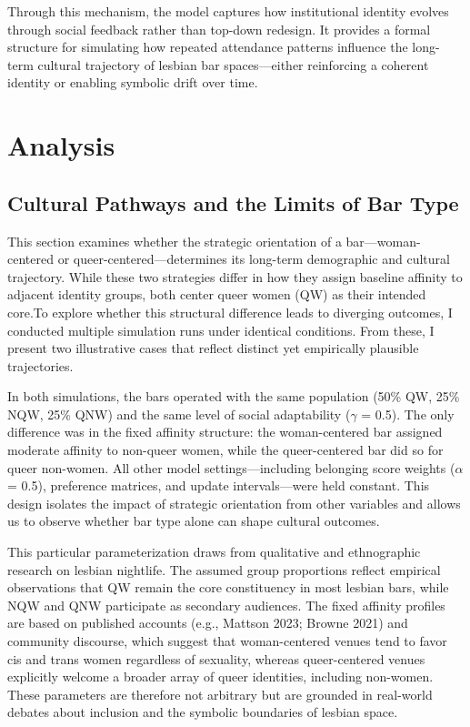 \documentclass{article}
\begin{document}
Through this mechanism, the model captures how institutional identity evolves through social feedback rather than top-down redesign. It provides a formal structure for simulating how repeated attendance patterns influence the long-term cultural trajectory of lesbian bar spaces—either reinforcing a coherent identity or enabling symbolic drift over time.

\section{Analysis}

\subsection{Cultural Pathways and the Limits of Bar Type}

This section examines whether the strategic orientation of a bar—woman-centered or queer-centered—determines its long-term demographic and cultural trajectory. While these two strategies differ in how they assign baseline affinity to adjacent identity groups, both center queer women (QW) as their intended core.To explore whether this structural difference leads to diverging outcomes, I conducted multiple simulation runs under identical conditions. From these, I present two illustrative cases that reflect distinct yet empirically plausible trajectories.

In both simulations, the bars operated with the same population (50\% QW, 25\% NQW, 25\% QNW) and the same level of social adaptability ($\gamma$ = 0.5). The only difference was in the fixed affinity structure: the woman-centered bar assigned moderate affinity to non-queer women, while the queer-centered bar did so for queer non-women. All other model settings—including belonging score weights ($\alpha$ = 0.5), preference matrices, and update intervals—were held constant. This design isolates the impact of strategic orientation from other variables and allows us to observe whether bar type alone can shape cultural outcomes.

This particular parameterization draws from qualitative and ethnographic research on lesbian nightlife. The assumed group proportions reflect empirical observations that QW remain the core constituency in most lesbian bars, while NQW and QNW participate as secondary audiences. The fixed affinity profiles are based on published accounts (e.g., Mattson 2023; Browne 2021) and community discourse, which suggest that woman-centered venues tend to favor cis and trans women regardless of sexuality, whereas queer-centered venues explicitly welcome a broader array of queer identities, including non-women. These parameters are therefore not arbitrary but are grounded in real-world debates about inclusion and the symbolic boundaries of lesbian space.
\end{document}
